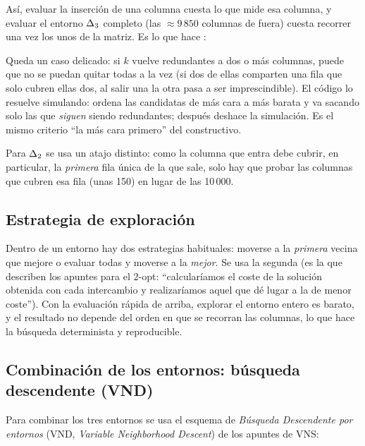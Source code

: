 Así, evaluar la inserción de una columna cuesta lo que mide esa columna, y evaluar el entorno
$\Delta_{3}$ completo (las $\approx 9\,850$ columnas de fuera) cuesta recorrer una vez los unos de
la matriz. Es lo que hace :


Queda un caso delicado: si $k$ vuelve redundantes a dos o más columnas, puede que no se
puedan quitar todas a la vez (si dos de ellas comparten una fila que solo cubren ellas
dos, al salir una la otra pasa a ser imprescindible). El código lo resuelve simulando: ordena las candidatas de
más cara a más barata y va sacando solo las que \emph{siguen} siendo redundantes; después
deshace la simulación. Es el mismo criterio ``la más cara primero'' del constructivo.


Para $\Delta_{2}$ se usa un atajo distinto: como la columna que entra debe cubrir, en particular, la
\emph{primera} fila única de la que sale, solo hay que probar las columnas que cubren esa
fila (unas 150) en lugar de las 10\,000.


\subsection{Estrategia de exploración}

\begin{decision}
Dentro de un entorno hay dos estrategias habituales: moverse a la \emph{primera} vecina que
mejore o evaluar todas y moverse a la \emph{mejor}. Se usa la segunda (es la que describen
los apuntes para el 2-opt: ``calcularíamos el coste de la solución obtenida con cada
intercambio y realizaríamos aquel que dé lugar a la de menor coste''). Con la evaluación
rápida de arriba, explorar el entorno entero es barato, y el resultado no depende del orden
en que se recorran las columnas, lo que hace la búsqueda determinista y reproducible.
\end{decision}

\subsection{Combinación de los entornos: búsqueda descendente (VND)}\label{sec:vnd}

Para combinar los tres entornos se usa el esquema de \emph{Búsqueda Descendente por entornos}
(VND, \emph{Variable Neighborhood Descent}) de los apuntes de VNS:

